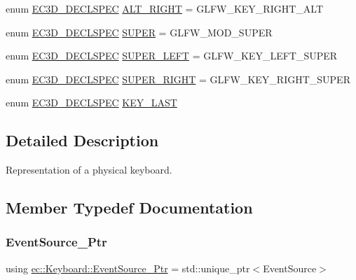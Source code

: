 \begin{DoxyCompactItemize}
\item 
enum \mbox{\hyperlink{_common_8h_aac42573e202ca3dd4d259c81691e2369}{E\+C3\+D\+\_\+\+D\+E\+C\+L\+S\+P\+EC}} \mbox{\hyperlink{classec_1_1_keyboard_a02d38de4e933d4ed6712fc688d428019}{A\+L\+T\+\_\+\+R\+I\+G\+HT}} = G\+L\+F\+W\+\_\+\+K\+E\+Y\+\_\+\+R\+I\+G\+H\+T\+\_\+\+A\+LT
\item 
enum \mbox{\hyperlink{_common_8h_aac42573e202ca3dd4d259c81691e2369}{E\+C3\+D\+\_\+\+D\+E\+C\+L\+S\+P\+EC}} \mbox{\hyperlink{classec_1_1_keyboard_a30098a75ef82c64a8f01147ada71f465}{S\+U\+P\+ER}} = G\+L\+F\+W\+\_\+\+M\+O\+D\+\_\+\+S\+U\+P\+ER
\item 
enum \mbox{\hyperlink{_common_8h_aac42573e202ca3dd4d259c81691e2369}{E\+C3\+D\+\_\+\+D\+E\+C\+L\+S\+P\+EC}} \mbox{\hyperlink{classec_1_1_keyboard_a0d12c25511dcf7ba48a4b926303d7f8b}{S\+U\+P\+E\+R\+\_\+\+L\+E\+FT}} = G\+L\+F\+W\+\_\+\+K\+E\+Y\+\_\+\+L\+E\+F\+T\+\_\+\+S\+U\+P\+ER
\item 
enum \mbox{\hyperlink{_common_8h_aac42573e202ca3dd4d259c81691e2369}{E\+C3\+D\+\_\+\+D\+E\+C\+L\+S\+P\+EC}} \mbox{\hyperlink{classec_1_1_keyboard_a8b2f2d479c90e90ae51fbbbc4c21c980}{S\+U\+P\+E\+R\+\_\+\+R\+I\+G\+HT}} = G\+L\+F\+W\+\_\+\+K\+E\+Y\+\_\+\+R\+I\+G\+H\+T\+\_\+\+S\+U\+P\+ER
\item 
enum \mbox{\hyperlink{_common_8h_aac42573e202ca3dd4d259c81691e2369}{E\+C3\+D\+\_\+\+D\+E\+C\+L\+S\+P\+EC}} \mbox{\hyperlink{classec_1_1_keyboard_a599f8a3b8addd9f6cdabfad9d0e773c4}{K\+E\+Y\+\_\+\+L\+A\+ST}}
\end{DoxyCompactItemize}


\subsection{Detailed Description}
Representation of a physical keyboard. 

\subsection{Member Typedef Documentation}
\mbox{\label{classec_1_1_keyboard_a9d797ac5b4d42f3b586091bcc14e6343}} 
\subsubsection{\texorpdfstring{Event\+Source\+\_\+\+Ptr}{EventSource\_Ptr}}
{\footnotesize\ttfamily using \mbox{\hyperlink{classec_1_1_keyboard_a9d797ac5b4d42f3b586091bcc14e6343}{ec\+::\+Keyboard\+::\+Event\+Source\+\_\+\+Ptr}} =  std\+::unique\+\_\+ptr$<$Event\+Source$>$}



